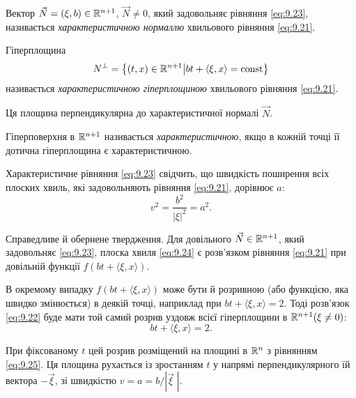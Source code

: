 \begin{definition}
    Вектор $\vec N = (\xi, b) \in \mathbb{R}^{n + 1}$, $\vec N \ne 0$, який задовольняє рівняння \eqref{eq:9.23}, називається \textit{характеристичною нормаллю} хвильового рівняння \eqref{eq:9.21}.
\end{definition}

\begin{definition}
    Гіперплощина
    \begin{equation}
        N^\perp = \left\{(t, x) \in \RR^{n + 1} \middle| b t + \langle \xi, x \rangle = \const \right\}
    \end{equation}
    називається \textit{характеристичною гіперплощиною} хвильового рівняння \eqref{eq:9.21}.
\end{definition}
 
Ця площина перпендикулярна до характеристичної нормалі $\vec N$.

\begin{definition}
    Гіперповерхня в $\mathbb{R}^{n + 1}$ називається \textit{характеристичною}, якщо в кожній точці її дотична гіперплощина є характеристичною.    
\end{definition}

Характеристичне рівняння \eqref{eq:9.23} свідчить, що швидкість поширення всіх плоских хвиль, які задовольняють рівняння \eqref{eq:9.21}, дорівнює $a$:
\begin{equation}
    \label{eq:9.24}
    v^2 = \frac{b^2}{\left| \xi \right|^2} = a^2.
\end{equation}

Справедливе й обернене твердження. Для довільного $\vec N \in \mathbb{R}^{n + 1}$, який задовольняє \eqref{eq:9.23}, плоска хвиля \eqref{eq:9.24} є розв'язком рівняння \eqref{eq:9.21} при довільній функції $f(bt + \langle \xi, x \rangle)$. \medskip

В окремому випадку $f(b t + \langle \xi, x \rangle)$ може бути й розривною (або функцією, яка швидко змінюється) в деякій точці, наприклад при $b t + \langle \xi, x \rangle = 2$. Тоді розв'язок \eqref{eq:9.22} буде мати той самий розрив уздовж всієї гіперплощини в $\mathbb{R}^{n + 1}(\xi \ne 0)$:
\begin{equation}
    \label{eq:9.25}
    b t + \langle \xi, x \rangle = 2.
\end{equation}

При фіксованому $t$ цей розрив розміщений на площині в $\mathbb{R}^n$ з рівнянням \eqref{eq:9.25}. Ця площина рухається із зростанням $t$ у напрямі перпендикулярного їй вектора $- \vec \xi$, зі швидкістю $v = a = b / \left| \vec \xi \; \right|$. \medskip

